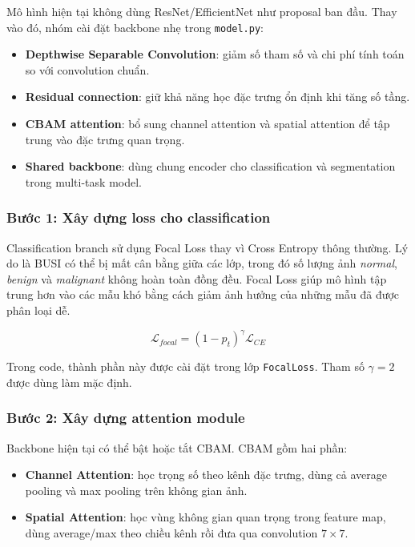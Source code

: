 \documentclass[12pt,a4paper]{article}
\begin{document}
Mô hình hiện tại không dùng ResNet/EfficientNet như proposal ban đầu. Thay vào đó, nhóm cài đặt backbone nhẹ trong \texttt{model.py}:

\begin{itemize}
    \item \textbf{Depthwise Separable Convolution}: giảm số tham số và chi phí tính toán so với convolution chuẩn.
    \item \textbf{Residual connection}: giữ khả năng học đặc trưng ổn định khi tăng số tầng.
    \item \textbf{CBAM attention}: bổ sung channel attention và spatial attention để tập trung vào đặc trưng quan trọng.
    \item \textbf{Shared backbone}: dùng chung encoder cho classification và segmentation trong multi-task model.
\end{itemize}

\subsubsection*{Bước 1: Xây dựng loss cho classification}

Classification branch sử dụng Focal Loss thay vì Cross Entropy thông thường. Lý do là BUSI có thể bị mất cân bằng giữa các lớp, trong đó số lượng ảnh \textit{normal}, \textit{benign} và \textit{malignant} không hoàn toàn đồng đều. Focal Loss giúp mô hình tập trung hơn vào các mẫu khó bằng cách giảm ảnh hưởng của những mẫu đã được phân loại dễ.

\[
\mathcal{L}_{focal}
= (1 - p_t)^\gamma \mathcal{L}_{CE}
\]

Trong code, thành phần này được cài đặt trong lớp \texttt{FocalLoss}. Tham số \(\gamma = 2\) được dùng làm mặc định.

\subsubsection*{Bước 2: Xây dựng attention module}

Backbone hiện tại có thể bật hoặc tắt CBAM. CBAM gồm hai phần:

\begin{itemize}
    \item \textbf{Channel Attention}: học trọng số theo kênh đặc trưng, dùng cả average pooling và max pooling trên không gian ảnh.
    \item \textbf{Spatial Attention}: học vùng không gian quan trọng trong feature map, dùng average/max theo chiều kênh rồi đưa qua convolution \(7 \times 7\).
\end{itemize}
\end{document}
